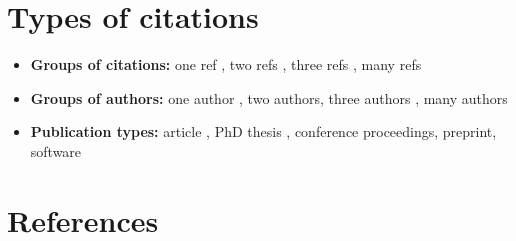 \documentclass{article}
\begin{document}
\vspace{-2cm}
\maketitle

\section{Types of citations}

\begin{itemize}
\item
	\textbf{Groups of citations:} one ref {\cite{karelPhD}}, two refs \cite{karelPhD,simplitigs},
  three refs \cite{karelPhD,gnt,simplitigs}, many refs
\item
  \textbf{Groups of authors:} one author \cite{karelPhD}, two authors, three
  authors \cite{simplitigs}, many authors \cite{gnt}
\item
  \textbf{Publication types:} article \cite{gnt}, PhD thesis \cite{karelPhD},
  conference proceedings, preprint, software
\end{itemize}


\section{References}

\printbibliography
\end{document}
